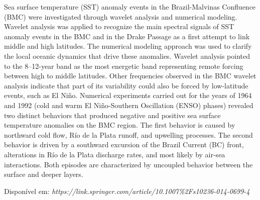 \noindent Sea surface temperature (SST) anomaly events in the Brazil-Malvinas Confluence (BMC) were investigated through wavelet analysis and numerical modeling. Wavelet analysis was applied to recognize the main spectral signals of SST anomaly events in the BMC and in the Drake Passage as a first attempt to link middle and high latitudes. The numerical modeling approach was used to clarify the local oceanic dynamics that drive these anomalies. Wavelet analysis pointed to the 8–12-year band as the most energetic band representing remote forcing between high to middle latitudes. Other frequencies observed in the BMC wavelet analysis indicate that part of its variability could also be forced by low-latitude events, such as El Niño. Numerical experiments carried out for the years of 1964 and 1992 (cold and warm El Niño-Southern Oscillation (ENSO) phases) revealed two distinct behaviors that produced negative and positive sea surface temperature anomalies on the BMC region. The first behavior is caused by northward cold flow, Río de la Plata runoff, and upwelling processes. The second behavior is driven by a southward excursion of the Brazil Current (BC) front, alterations in Río de la Plata discharge rates, and most likely by air-sea interactions. Both episodes are characterized by uncoupled behavior between the surface and deeper layers.
\bigskip

\noindent {}
\bigskip

\noindent Disponível em: \textcolor{bleu_cite}{\textit{https://link.springer.com/article/10.1007\%2Fs10236-014-0699-4}}
\bigskip
